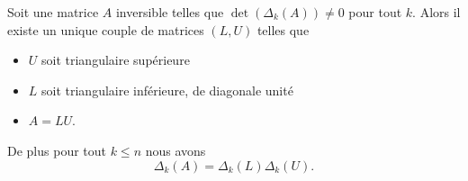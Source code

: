 \begin{theorem}       \label{THOooUXKJooYaPhiu}
    Soit une matrice \( A\) inversible telles que \( \det(\Delta_k(A))\neq 0\) pour tout \( k\). Alors il existe un unique couple de matrices \( (L,U)\) telles que
    \begin{itemize}
        \item \( U\) soit triangulaire supérieure
        \item \( L\) soit triangulaire inférieure, de diagonale unité
        \item \( A=LU\).
    \end{itemize}
    De plus pour tout \( k\leq n\) nous avons
    \begin{equation}
        \Delta_k(A)=\Delta_k(L)\Delta_k(U).
    \end{equation}
\end{theorem}

